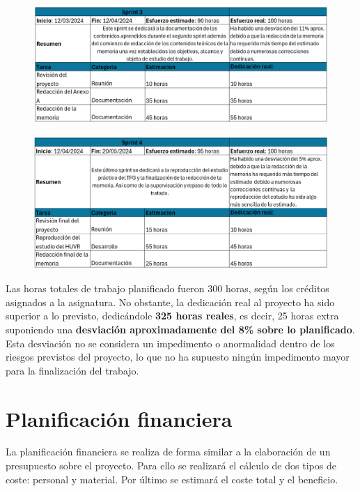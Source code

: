 \begin{figure}[H]
    \centering
    \includegraphics[width=1\textwidth]{tables/sprint3cap.png}
    \label{table:sprint3cap}
\end{figure}

\begin{figure}[H]
    \centering
    \includegraphics[width=1\textwidth]{tables/sprint4cap.png}
    \label{table:sprint4cap}
\end{figure}

Las horas totales de trabajo planificado fueron 300 horas, según los créditos asignados a la asignatura. No obstante, la dedicación real al proyecto ha sido superior a lo previsto, dedicándole \textbf{325 horas reales}, es decir, 25 horas extra suponiendo una \textbf{desviación aproximadamente del 8\% sobre lo planificado}. Esta desviación no se considera un impedimento o anormalidad dentro de los riesgos previstos del proyecto, lo que no ha supuesto ningún impedimento mayor para la finalización del trabajo.

\section{Planificación financiera} \label{sec:03Costes}

La planificación financiera se realiza de forma similar a la elaboración de un presupuesto sobre el proyecto. Para ello se realizará el cálculo de dos tipos de coste: personal y material. Por último se estimará el coste total y el beneficio.

